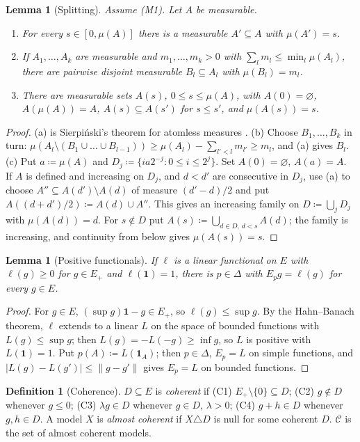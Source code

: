 \documentclass[11pt]{article}
\newtheorem{lemma}[theorem]{Lemma}
\theoremstyle{definition}
\newtheorem{definition}[theorem]{Definition}
\theoremstyle{remark}
\newcommand{\C}{\mathcal C}
\newcommand{\one}{\mathbf 1}
\begin{document}
\begin{lemma}[Splitting]\label{lem:split}
Assume (M1). Let $A$ be measurable.
\begin{enumerate}[label=(\alph*)]
\item For every $s\in[0,\mu(A)]$ there is a measurable $A'\subseteq A$ with $\mu(A')=s$.
\item If $A_1,\dots,A_k$ are measurable and $m_1,\dots,m_k>0$ with $\sum_lm_l\le\min_l\mu(A_l)$, there are pairwise disjoint measurable $B_l\subseteq A_l$ with $\mu(B_l)=m_l$.
\item There are measurable sets $A(s)$, $0\le s\le\mu(A)$, with $A(0)=\varnothing$, $A(\mu(A))=A$, $A(s)\subseteq A(s')$ for $s\le s'$, and $\mu(A(s))=s$.
\end{enumerate}
\end{lemma}
\begin{proof}
(a) is Sierpi\'nski's theorem for atomless measures \cite{Sierpinski1922}. (b) Choose $B_1,\dots,B_k$ in turn: $\mu(A_l\setminus(B_1\cup\dots\cup B_{l-1}))\ge\mu(A_l)-\sum_{l'<l}m_{l'}\ge m_l$, and (a) gives $B_l$. (c) Put $a\coloneqq\mu(A)$ and $D_j\coloneqq\{ia2^{-j}:0\le i\le2^j\}$. Set $A(0)=\varnothing$, $A(a)=A$. If $A$ is defined and increasing on $D_j$, and $d<d'$ are consecutive in $D_j$, use (a) to choose $A''\subseteq A(d')\setminus A(d)$ of measure $(d'-d)/2$ and put $A((d+d')/2)\coloneqq A(d)\cup A''$. This gives an increasing family on $D\coloneqq\bigcup_jD_j$ with $\mu(A(d))=d$. For $s\notin D$ put $A(s)\coloneqq\bigcup_{d\in D,\,d<s}A(d)$; the family is increasing, and continuity from below gives $\mu(A(s))=s$.
\end{proof}

\begin{lemma}[Positive functionals]\label{lem:extension}
If $\ell$ is a linear functional on $E$ with $\ell(g)\ge0$ for $g\in E_+$ and $\ell(\one)=1$, there is $p\in\Delta$ with $E_pg=\ell(g)$ for every $g\in E$.
\end{lemma}
\begin{proof}
For $g\in E$, $(\sup g)\one-g\in E_+$, so $\ell(g)\le\sup g$. By the Hahn--Banach theorem, $\ell$ extends to a linear $L$ on the space of bounded functions with $L(g)\le\sup g$; then $L(g)=-L(-g)\ge\inf g$, so $L$ is positive with $L(\one)=1$. Put $p(A)\coloneqq L(\one_A)$; then $p\in\Delta$, $E_p=L$ on simple functions, and $|L(g)-L(g')|\le\|g-g'\|$ gives $E_p=L$ on bounded functions.
\end{proof}

\begin{definition}[Coherence]\label{def:coherence}
$D\subseteq E$ is \emph{coherent} if (C1) $E_+\setminus\{0\}\subseteq D$; (C2) $g\notin D$ whenever $g\le0$; (C3) $\lambda g\in D$ whenever $g\in D$, $\lambda>0$; (C4) $g+h\in D$ whenever $g,h\in D$. A model $X$ is \emph{almost coherent} if $X\triangle D$ is null for some coherent $D$. $\C$ is the set of almost coherent models.
\end{definition}
\end{document}
